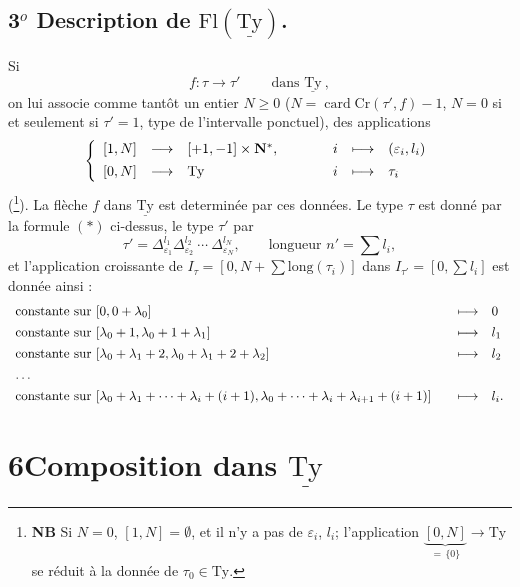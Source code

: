 \documentclass[11pt]{article}
\newcommand{\printedpage}[1]{\if\relax\detokenize{#1}\relax\else\marginpar{\raggedright\footnotesize p.~#1}\fi}
\newcommand{\msp}[1]{\marginpar{\raggedright\footnotesize [#1]}}
\newcommand{\Ty}{\mathrm{Ty}}
\newcommand{\uTy}{\underline{\mathrm{Ty}}}
\begin{document}
\subsection*{3$^o$ Description de $\mathrm{Fl}(\uTy)$.}

Si
\[
f : \tau \longrightarrow \tau' \qquad \ \text{dans } \uTy\ ,
\]
on lui associe comme tantôt un entier \underline{$N \geq 0$} ($N = \operatorname{card}\mathrm{Cr}(\tau', f){-}1$, $N = 0$ si et seulement si $\tau' = 1$, type de l'intervalle ponctuel), des applications
\[
\left\{
\begin{array}{lcl@{\qquad\qquad}ccl}
{[1,N]} & \longrightarrow & [+1,-1] \times \mathbf{N}^*, & i & \longmapsto & (\varepsilon_i, l_i) \\[1ex]
{[0,N]} & \longrightarrow & \Ty & i & \longmapsto & \tau_i
\end{array}
\right.
\]
(\footnote[14]{\textbf{NB} Si $N = 0$, $[1,N] = \emptyset$, et il n'y a pas de $\varepsilon_i$, $l_i$; l'application $\underbrace{[0,N]}_{=\,\{0\}} \longrightarrow \Ty$ se réduit à la donnée de $\tau_0 \in \Ty$.}). La flèche $f$ dans $\uTy$ est determinée par ces données. Le type $\tau$ est donné par la formule $(*)$ ci-dessus, le type $\tau'$ par %
\[
\tau' = \Delta^{l_1}_{\varepsilon_1} \Delta^{l_2}_{\varepsilon_2}\ \cdots\ \Delta^{l_N}_{\varepsilon_N}, \qquad \text{longueur } n' = \textstyle\sum l_i, \tag*{$(*')$}
\]
\printedpage{31}
et l'application croissante de $I_\tau = [0, N + \sum \mathrm{long}(\tau_i)]$ dans $I_{\tau'} = [0, \sum l_i]$ est donnée ainsi :
\[
\begin{array}{l@{\qquad}cl}
\text{constante sur } [0, 0+\lambda_0] & \longmapsto & 0 \\[1ex]
\text{constante sur } [\lambda_0+1, \lambda_0+1+\lambda_1] & \longmapsto & l_1 \\[1ex]
\text{constante sur } [\lambda_0+\lambda_1+2, \lambda_0+\lambda_1+2+\lambda_2] & \longmapsto & l_2 \\[1ex]
\ldots & & \\[1ex]
\text{constante sur } [\lambda_0+\lambda_1+\cdots+\lambda_i+(i+1), \lambda_0+\cdots+\lambda_i+\lambda_{i+1}+(i+1)] & \longmapsto & l_i.
\end{array}
\]

\printedpage{32}
\msp{page 48}

\section*{6\quad Composition dans $\uTy$}
\end{document}
